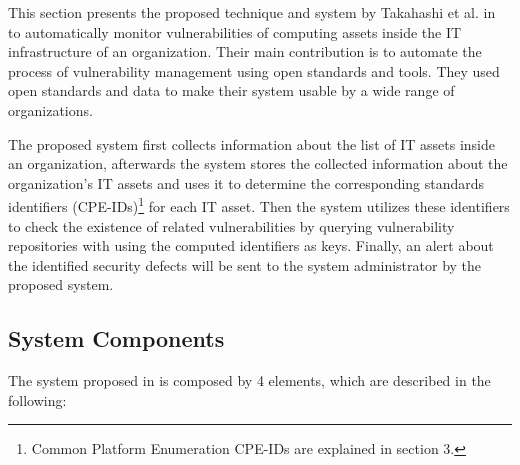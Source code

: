 \documentclass{llncs}
\begin{document}
\par This section presents the proposed technique and system by Takahashi et al. in \cite{paper1} to automatically monitor vulnerabilities of computing assets inside the IT infrastructure of an organization. Their main contribution is to automate the process of vulnerability management using open standards and tools. They used open standards and data to make their system usable by a wide range of organizations.
\par
 The proposed system first collects information about the list of IT assets inside an organization, afterwards the system stores the collected information about the organization's IT assets and uses it to determine the corresponding standards identifiers (CPE-IDs)\footnote{ Common Platform Enumeration CPE-IDs are explained in section 3.} for each IT asset. Then the system utilizes these identifiers to check the existence of related vulnerabilities by querying vulnerability repositories with using the computed identifiers as keys. Finally, an alert about the identified security defects will be sent to the system administrator by the proposed system.
    
\subsection{System Components}

\par The system proposed in \cite{paper1} is composed by 4 elements, which are described in the following:
\end{document}
